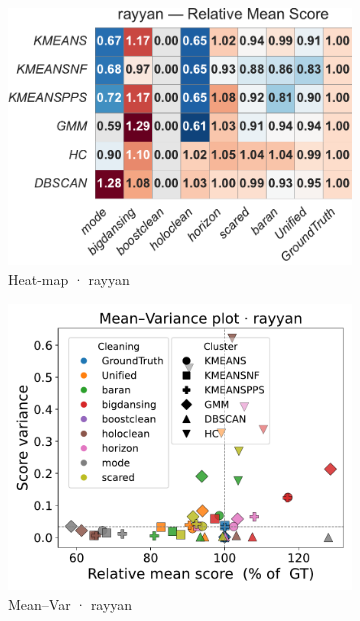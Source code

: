 \documentclass[10pt]{article} %
\numberwithin{equation}{section}
\begin{document}
\begin{figure}[htbp]
  \vspace{0.6em}
  \begin{subfigure}{0.32\linewidth}
    \centering
    \includegraphics[width=\linewidth]{figures/5.3.1graph/heatmap_rel_rayyan.pdf}
    \caption{Heat-map · rayyan}
  \end{subfigure}\hfill
  \begin{subfigure}{0.32\linewidth}
    \centering
    \includegraphics[width=\linewidth]{figures/5.3.1graph/mean_var_scatter_rayyan.pdf}
    \caption{Mean–Var · rayyan}
  \end{subfigure}\hfill
  \begin{subfigure}{0.32\linewidth}

\end{subfigure}
\end{figure}
\end{document}
